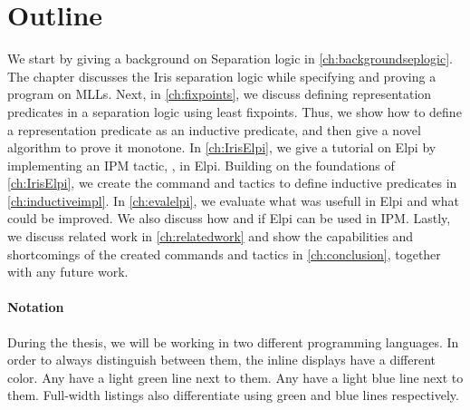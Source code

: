 \documentclass[thesis.tex]{subfiles}
\begin{document}
\section{Outline}
We start by giving a background on Separation logic in \cref{ch:backgroundseplogic}. The chapter discusses the Iris separation logic while specifying and proving a program on MLLs. Next, in \cref{ch:fixpoints}, we discuss defining representation predicates in a separation logic using least fixpoints. Thus, we show how to define a representation predicate as an inductive predicate, and then give a novel algorithm to prove it monotone. In \cref{ch:IrisElpi}, we give a tutorial on Elpi by implementing an IPM tactic, , in Elpi. Building on the foundations of \cref{ch:IrisElpi}, we create the command and tactics to define inductive predicates in \cref{ch:inductiveimpl}. In \cref{ch:evalelpi}, we evaluate what was usefull in Elpi and what could be improved. We also discuss how and if Elpi can be used in IPM. Lastly, we discuss related work in \cref{ch:relatedwork} and show the capabilities and shortcomings of the created commands and tactics in \cref{ch:conclusion}, together with any future work.

\paragraph{Notation}
During the thesis, we will be working in two different programming languages. In order to always distinguish between them, the inline displays have a different color. Any  have a light green line next to them. Any  have a light blue line next to them. Full-width listings also differentiate using green and blue lines respectively.

\end{document}
